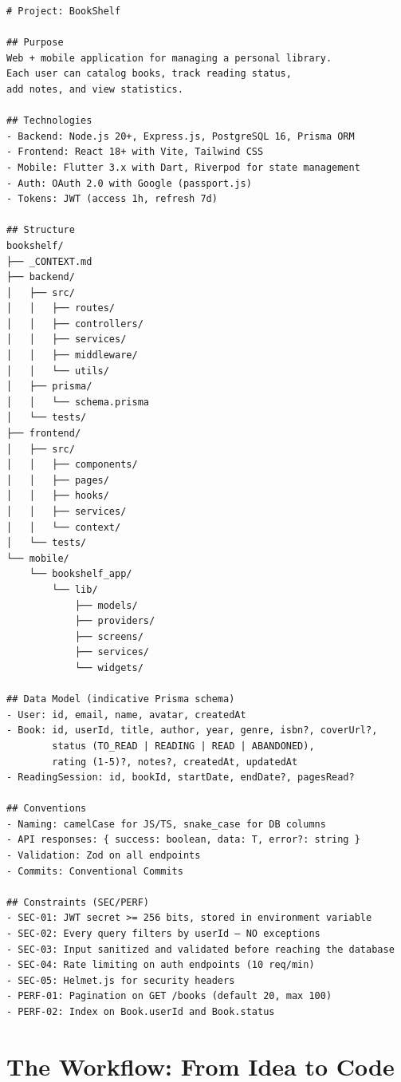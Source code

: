 \begin{lstlisting}[language={},title={\_CONTEXT.md --- BookShelf starter}]
# Project: BookShelf

## Purpose
Web + mobile application for managing a personal library.
Each user can catalog books, track reading status,
add notes, and view statistics.

## Technologies
- Backend: Node.js 20+, Express.js, PostgreSQL 16, Prisma ORM
- Frontend: React 18+ with Vite, Tailwind CSS
- Mobile: Flutter 3.x with Dart, Riverpod for state management
- Auth: OAuth 2.0 with Google (passport.js)
- Tokens: JWT (access 1h, refresh 7d)

## Structure
bookshelf/
├── _CONTEXT.md
├── backend/
│   ├── src/
│   │   ├── routes/
│   │   ├── controllers/
│   │   ├── services/
│   │   ├── middleware/
│   │   └── utils/
│   ├── prisma/
│   │   └── schema.prisma
│   └── tests/
├── frontend/
│   ├── src/
│   │   ├── components/
│   │   ├── pages/
│   │   ├── hooks/
│   │   ├── services/
│   │   └── context/
│   └── tests/
└── mobile/
    └── bookshelf_app/
        └── lib/
            ├── models/
            ├── providers/
            ├── screens/
            ├── services/
            └── widgets/

## Data Model (indicative Prisma schema)
- User: id, email, name, avatar, createdAt
- Book: id, userId, title, author, year, genre, isbn?, coverUrl?,
        status (TO_READ | READING | READ | ABANDONED),
        rating (1-5)?, notes?, createdAt, updatedAt
- ReadingSession: id, bookId, startDate, endDate?, pagesRead?

## Conventions
- Naming: camelCase for JS/TS, snake_case for DB columns
- API responses: { success: boolean, data: T, error?: string }
- Validation: Zod on all endpoints
- Commits: Conventional Commits

## Constraints (SEC/PERF)
- SEC-01: JWT secret >= 256 bits, stored in environment variable
- SEC-02: Every query filters by userId — NO exceptions
- SEC-03: Input sanitized and validated before reaching the database
- SEC-04: Rate limiting on auth endpoints (10 req/min)
- SEC-05: Helmet.js for security headers
- PERF-01: Pagination on GET /books (default 20, max 100)
- PERF-02: Index on Book.userId and Book.status
\end{lstlisting}

\section{The Workflow: From Idea to Code}

